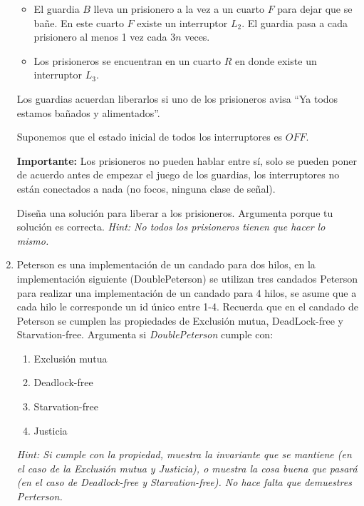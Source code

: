 \begin{enumerate}
\begin{itemize}
        \item El guardia $B$ lleva un prisionero a la vez a un cuarto $F$ para dejar que se bañe. En este cuarto $F$ existe un interruptor $L_2$. El guardia pasa a cada prisionero al menos 1 vez cada $3n$ veces.
        
        \item Los prisioneros se encuentran en un cuarto $R$ en donde existe un interruptor $L_3$.
    \end{itemize}

    Los guardias acuerdan liberarlos si uno de los prisioneros avisa “Ya todos estamos bañados y alimentados”.
    
    Suponemos que el estado inicial de todos los interruptores es $OFF$.

    \textbf{Importante:} Los prisioneros no pueden hablar entre sí, solo se pueden poner de acuerdo antes de empezar el juego de los guardias, los interruptores no están conectados a nada (no focos, ninguna clase de señal).

    Diseña una solución para liberar a los prisioneros. Argumenta porque tu solución es correcta. \textit{Hint: No todos los prisioneros tienen que hacer lo mismo.}

    \hfill

    \item Peterson es una implementación de un candado para dos hilos, en la implementación siguiente (DoublePeterson) se utilizan tres candados Peterson para realizar una implementación de un candado para 4 hilos, se asume que a cada hilo le corresponde un id único entre 1-4. Recuerda que en el candado de Peterson se cumplen las propiedades de Exclusión mutua, DeadLock-free y Starvation-free. Argumenta si \textit{DoublePeterson} cumple con:

    \begin{enumerate}
        \item Exclusión mutua

        \item Deadlock-free

        \item Starvation-free
        
        \item Justicia
    \end{enumerate}

    \textit{Hint: Si cumple con la propiedad, muestra la invariante que se mantiene (en el caso de la Exclusión mutua y Justicia), o muestra la cosa buena que pasará (en el caso de Deadlock-free y Starvation-free). No hace falta que demuestres Perterson.}
    

\end{enumerate}
